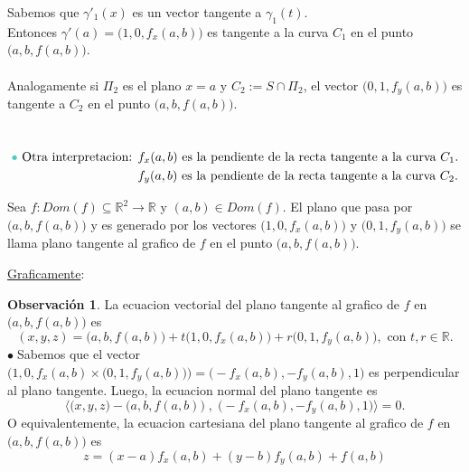 \documentclass{article}
\theoremstyle{definition}
\theoremstyle{definition}
\newtheorem*{obs}{Observación}
\theoremstyle{remark}
\newcommand\bl{$\bullet\;$}
\begin{document}
Sabemos que $\gamma'_1(x)$ es un vector tangente a $\gamma_1(t)$. \\ Entonces $\gamma'(a)=\big(1,0,f_x(a,b)\big)$ es tangente a la curva $C_1$ en el punto $\big(a,b,f(a,b)\big)$.\\\\
Analogamente si $\Pi_2$ es el plano $x=a$\; y\; $C_2:= S \cap \Pi_2$, el vector $\big(0,1,f_y(a,b)\big)$ es tangente a $C_2$ en el punto $\big(a,b,f(a,b)\big)$.
\begin{figure}[h]
\centering
\def\svgwidth{0.75\textwidth}

\end{figure} \\
 \begin{align*}
  \textcolor{verdep2}{\bullet}\text{ Otra interpretacion: } & f_x(a,b) \text{ es la pendiente de la recta tangente a la curva }C_1.\\
                              & f_y(a,b) \text{ es la pendiente de la recta tangente a la curva }C_2. \end{align*}
                              \pagebreak
\begin{defi}
  Sea $f : Dom(f) \subseteq \mathbb{R}^2 \to \mathbb{R}$ y $(a,b) \in Dom(f)$. El plano que pasa por $\big(a,b,f(a,b)\big)$ y es generado por los vectores $\big(1,0,f_x(a,b)\big)$ y $\big(0,1,f_y(a,b)\big)$ se llama plano tangente al grafico de $f$ en el punto $\big(a,b,f(a,b)\big)$.
\end{defi}
\underline{Graficamente}:
\begin{figure}[h]
\centering
\def\svgwidth{0.35\textwidth}

\end{figure} 
\begin{obs}
  La ecuacion vectorial del plano tangente al grafico de $f$ en $\big(a,b,f(a,b)\big)$ es \[
    (x,y,z) = \big(a,b,f(a,b)\big)+t\big(1,0,f_x(a,b)\big)+r\big(0,1,f_y(a,b)\big), \text{ con } t, r \in \mathbb{R}.
  \]
  \bl Sabemos que el vector $\big(1,0,f_x(a,b) \times \big(0,1,f_y(a,b)\big)\big)= \big(-f_x(a,b),-f_y(a,b),1\big)$ es perpendicular al plano tangente. Luego, la ecuacion normal del plano tangente es \[
    \big\langle\big(x,y,z\big)-\big(a,b,f(a,b)\big) \; , \; \big(-f_x(a,b),-f_y(a,b),1\big)\big\rangle =0.
    \] O equivalentemente, la ecuacion cartesiana del plano tangente al grafico de $f$ en $\big(a,b,f(a,b)\big)$ es\[
    z=(x-a)f_x(a,b)+(y-b)f_y(a,b)+f(a,b)
  \]
\end{obs}\pagebreak
\end{document}
